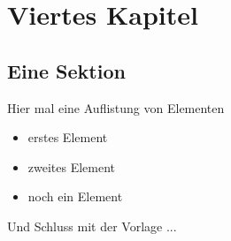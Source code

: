 \chapter{Viertes Kapitel}
\section{Eine Sektion}

Hier mal eine Auflistung von Elementen
\begin{itemize}
 \item erstes Element
 \item zweites Element
 \item noch ein Element
\end{itemize}

Und Schluss mit der Vorlage ...
